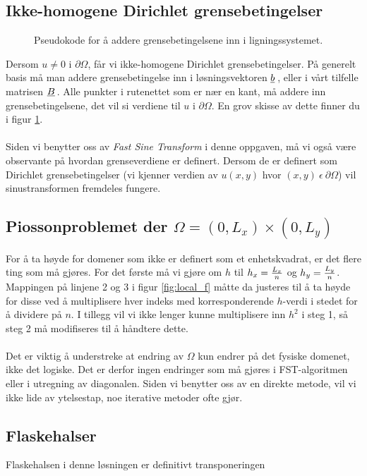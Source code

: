 \documentclass{article}
\newcommand{\ub}[1]{\underbar{$#1$}\,}
\begin{document}
\subsection{Ikke-homogene Dirichlet grensebetingelser}
\begin{figure}[h]
	\centering
	
	\caption{Pseudokode for å addere grensebetingelsene inn i ligningssystemet.}
	\label{fig:non_homogenous_dirichlet}
\end{figure}
Dersom $u \neq 0$ i $\partial\Omega$, får vi ikke-homogene Dirichlet grensebetingelser. På generelt basis må man addere grensebetingelse inn i løsningsvektoren $\ub{b}$, eller i vårt tilfelle matrisen $\ub{B}$. Alle punkter i rutenettet som er nær en kant, må addere inn grensebetingelsene, det vil si verdiene til $u$ i $\partial\Omega$. En grov skisse av dette finner du i figur \ref{fig:non_homogenous_dirichlet}. \\
\\
Siden vi benytter oss av \emph{Fast Sine Transform} i denne oppgaven, må vi også være observante på hvordan grenseverdiene er definert. Dersom de er definert som Dirichlet grensebetingelser (vi kjenner verdien av $u(x, y)$ hvor $(x, y)\ \epsilon\ \partial\Omega$) vil sinustransformen fremdeles fungere.\\

\subsection{Piossonproblemet der $\Omega = (0, L_x) \times (0, L_y)$}
For å ta høyde for domener som ikke er definert som et enhetskvadrat, er det flere ting som må gjøres. For det første må vi gjøre om $h$ til $h_x = {L_x \over n}$ og $h_y = {L_y \over n}$. Mappingen på linjene 2 og 3 i figur \ref{fig:local_f} måtte da justeres til å ta høyde for disse ved å multiplisere hver indeks med korresponderende $h$-verdi i stedet for å dividere på $n$. I tillegg vil vi ikke lenger kunne multiplisere inn $h^2$ i steg 1, så steg 2 må modifiseres til å håndtere dette.\\
\\
Det er viktig å understreke at endring av $\Omega$ kun endrer på det fysiske domenet, ikke det logiske. Det er derfor ingen endringer som må gjøres i FST-algoritmen eller i utregning av diagonalen. Siden vi benytter oss av en direkte metode, vil vi ikke lide av ytelsestap, noe iterative metoder ofte gjør.

\subsection{Flaskehalser}
Flaskehalsen i denne løsningen er definitivt transponeringen


\end{document}
